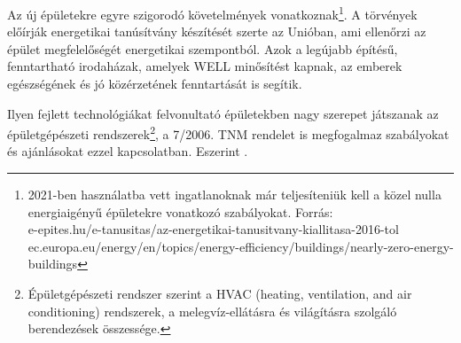 Az új épületekre egyre szigorodó követelmények vonatkoznak\footnote{2021-ben használatba vett ingatlanoknak már teljesíteniük kell a közel nulla energiaigényű épületekre vonatkozó szabályokat. Forrás: \\ e-epites.hu/e-tanusitas/az-energetikai-tanusitvany-kiallitasa-2016-tol \\ ec.europa.eu/energy/en/topics/energy-efficiency/buildings/nearly-zero-energy-buildings}.
A törvények előírják energetikai tanúsítvány készítését szerte az Unióban, ami ellenőrzi az épület megfelelőségét energetikai szempontból.
Azok a legújabb építésű, fenntartható irodaházak, amelyek WELL minősítést kapnak, az emberek egészségének és jó közérzetének fenntartását is segítik.

Ilyen fejlett technológiákat felvonultató épületekben nagy szerepet játszanak az épületgépészeti rendszerek\footnote{Épületgépészeti rendszer \cite{TNM2006} szerint a  HVAC (heating, ventilation, and air conditioning) rendszerek, a melegvíz-ellátásra és világításra szolgáló berendezések összessége.},
a 7/2006. TNM rendelet\cite{TNM2006} is megfogalmaz szabályokat és ajánlásokat ezzel kapcsolatban. Eszerint . 






